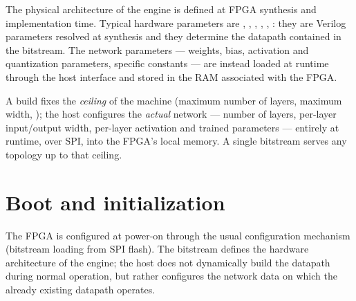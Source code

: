The physical architecture of the engine is defined at FPGA synthesis and
implementation time. Typical hardware parameters are ,
, , , ,
: they are Verilog parameters resolved at synthesis and they
determine the datapath contained in the bitstream. The network parameters --- weights,
bias, activation and quantization parameters, specific constants --- are instead loaded
at runtime through the host interface and stored in the RAM associated with the FPGA.

\begin{fnnote}
A build fixes the \emph{ceiling} of the machine (maximum number of layers, maximum
width, ); the host configures the \emph{actual} network --- number of
layers, per-layer input/output width, per-layer activation and trained parameters ---
entirely at runtime, over SPI, into the FPGA's local memory. A single bitstream serves
any topology up to that ceiling.
\end{fnnote}

\section{Boot and initialization}
The FPGA is configured at power-on through the usual configuration mechanism (bitstream
loading from SPI flash). The bitstream defines the hardware architecture of the engine;
the host does not dynamically build the datapath during normal operation, but rather
configures the network data on which the already existing datapath operates.

\begin{center}
\end{center}

